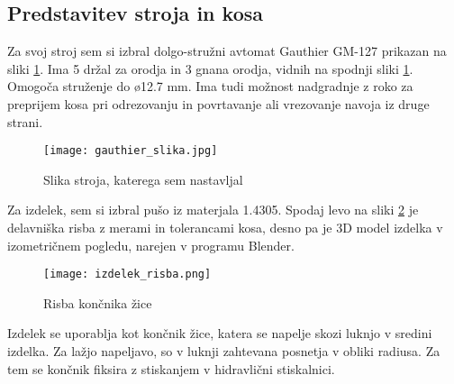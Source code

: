 \subsection{Predstavitev stroja in kosa}
Za svoj stroj sem si izbral dolgo-stružni avtomat Gauthier GM-127
prikazan na sliki \ref{gauthier_priblizano}.
Ima 5 držal za orodja in 3 gnana orodja, vidnih na spodnji
sliki \ref{gauthier_priblizano}. Omogoča struženje do ø12.7 mm.
Ima tudi možnost nadgradnje z roko za preprijem kosa pri odrezovanju in
povrtavanje ali vrezovanje navoja iz druge strani.

\begin{figure}[H]
	\begin{center}
		\texttt{[image: gauthier\_slika.jpg]}
		\caption{Slika stroja, katerega sem nastavljal
			\cite{interna}}
		\label{gauthier_priblizano}
	\end{center}
\end{figure}

Za izdelek, sem si izbral pušo iz materjala 1.4305.
Spodaj levo na sliki \ref{delavniska_risba} je delavniška risba z
merami in tolerancami kosa, desno pa je 3D model izdelka v izometričnem
pogledu, narejen v programu Blender.

\begin{figure}
	\begin{center}
		\texttt{[image: izdelek\_risba.png]}
		\caption{Risba končnika žice
			\cite{interna}}
		\label{delavniska_risba}
	\end{center}
\end{figure}

Izdelek se uporablja kot končnik žice, katera se napelje skozi
luknjo v sredini izdelka. Za lažjo napeljavo, so v luknji zahtevana
posnetja v obliki radiusa. Za tem se končnik fiksira z
stiskanjem v hidravlični stiskalnici.